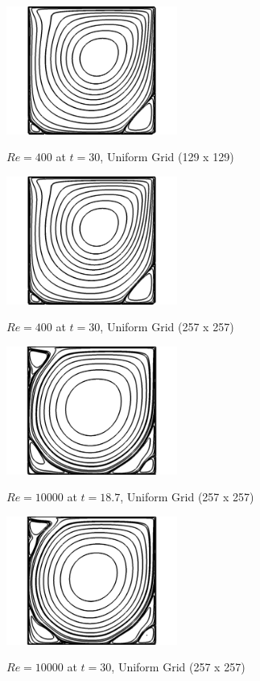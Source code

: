 \documentclass[twocolumn,10pt]{asme2ej}
\begin{document}
\begin{figure}[htb]
\begin{center}
\includegraphics[width=0.5\textwidth]{figure/Re400-129.png}
\caption{$Re = 400$ at $t = 30$, Uniform Grid (129 x 129)}
\label{Re400-129}
\vspace{5mm} %
\includegraphics[width=0.5\textwidth]{figure/Re400-257.png}
\caption{$Re = 400$ at $t = 30$, Uniform Grid (257 x 257)}
\label{Re400-257}
\end{center}
\end{figure}

\hfill

\begin{figure}[htb]
\begin{center}
\includegraphics[width=0.5\textwidth]{figure/Re10000.png}
\caption{$Re = 10000$ at $t = 18.7$, Uniform Grid (257 x 257)}
\label{Re10000}
\vspace{5mm} %
\includegraphics[width=0.5\textwidth]{figure/Re10000-fin.png}
\caption{$Re = 10000$ at $t = 30$, Uniform Grid (257 x 257)}
\label{Re10000-fin}
\end{center}
\end{figure}
\end{document}

